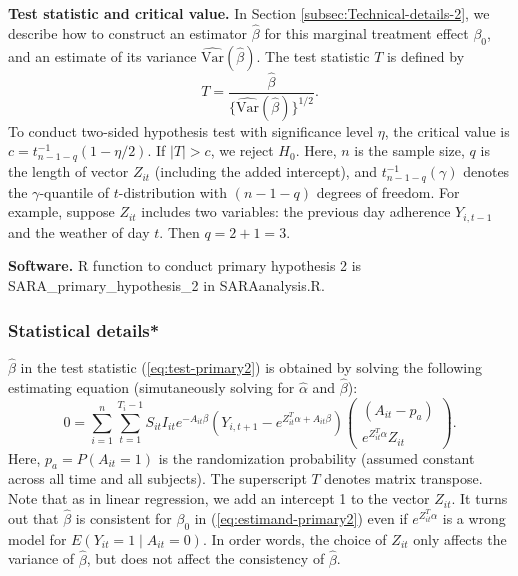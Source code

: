 \documentclass[11pt]{article}
\begin{document}
\textbf{Test statistic and critical value.} In Section \ref{subsec:Technical-details-2},
we describe how to construct an estimator $\hat{\beta}$ for this
marginal treatment effect $\beta_{0}$, and an estimate of its variance
$\widehat{\text{Var}}(\hat{\beta})$. The test statistic $T$ is defined
by
\begin{equation}
T=\frac{\hat{\beta}}{\{\widehat{\text{Var}}(\hat{\beta})\}^{1/2}}.\label{eq:test-primary2}
\end{equation}
To conduct two-sided hypothesis test with significance level $\eta$,
the critical value is $c=t_{n-1-q}^{-1}(1 - \eta / 2)$. If $|T|>c$, we
reject $H_{0}$. Here, $n$ is the sample size, $q$ is the length
of vector $Z_{it}$ (including the added intercept), and $t_{n-1-q}^{-1}(\gamma)$
denotes the $\gamma$-quantile of $t$-distribution with $(n-1-q)$
degrees of freedom. For example, suppose $Z_{it}$ includes two variables:
the previous day adherence $Y_{i,t-1}$ and the weather of day $t$.
Then $q=2+1=3$.

\textbf{Software.} R function to conduct primary hypothesis 2 is
\textsf{SARA\_primary\_hypothesis\_2} in \textsf{SARAanalysis.R}.

\subsubsection{Statistical details{*} \label{subsec:Technical-details-2}}

$\hat{\beta}$ in the test statistic (\ref{eq:test-primary2}) is
obtained by solving the following estimating equation (simutaneously
solving for $\hat{\alpha}$ and $\hat{\beta}$):
\begin{equation}
0=\sum_{i=1}^{n}\sum_{t=1}^{T_i - 1}S_{it} I_{it}e^{-A_{it}\beta}\left(Y_{i,t+1}-e^{Z_{it}^{T}\alpha+A_{it}\beta}\right)\begin{pmatrix}(A_{it}-p_{a})\\
e^{Z_{it}^{T}\alpha}Z_{it}
\end{pmatrix}.\label{eq:ee-primary2}
\end{equation}
Here, $p_{a}=P(A_{it}=1)$ is the randomization probability (assumed
constant across all time and all subjects). The superscript $T$ denotes
matrix transpose. Note that as in linear regression, we add an intercept
1 to the vector $Z_{it}$. It turns out that $\hat{\beta}$ is consistent
for $\beta_{0}$ in (\ref{eq:estimand-primary2}) even if $e^{Z_{it}^{T}\alpha}$
is a wrong model for $E(Y_{it}=1\mid A_{it}=0)$. In order words,
the choice of $Z_{it}$ only affects the variance of $\hat{\beta}$,
but does not affect the consistency of $\hat{\beta}$.
\end{document}
